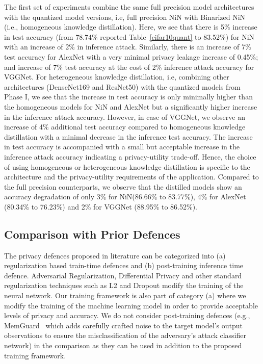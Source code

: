 The first set of experiments combine the same full precision model architectures with the quantized model versions, i.e, full precision NiN with Binarized NiN (i.e., homogeneous knowledge distillation).
Here, we see that there is 5\% increase in test accuracy (from 78.74\% reported Table~\ref{cifar10quant} to 83.52\%) for NiN with an increase of 2\% in inference attack.
Similarly, there is an increase of 7\% test accuracy for AlexNet with a very minimal privacy leakage increase of 0.45\%; and increase of 7\% test accuracy at the cost of 2\% inference attack accuracy for VGGNet.
For heterogeneous knowledge distillation, i.e, combining other architectures (DenseNet169 and ResNet50) with the quantized models from Phase I, we see that the increase in test accuracy is only minimally higher than the homogeneous models for NiN and AlexNet but a significantly higher increase in the inference attack accuracy.
However, in case of VGGNet, we observe an increase of 4\% additional test accuracy compared to homogeneous knowledge distillation with a minimal decrease in the inference test accuracy.
The increase in test accuracy is accompanied with a small but acceptable increase in the inference attack accuracy indicating a privacy-utility trade-off.
Hence, the choice of using homogeneous or heterogeneous knowledge distillation is specific to the architecture and the privacy-utility requirements of the application.
Compared to the full precision counterparts, we observe that the distilled models show an accuracy degradation of only 3\% for NiN(86.66\% to 83.77\%), 4\% for AlexNet (80.34\% to 76.23\%) and 2\% for VGGNet (88.95\% to 86.52\%).

\subsection{Comparison with Prior Defences}
\label{eval-defences}

The privacy defences proposed in literature can be categorized into (a) regularization based train-time defences and (b) post-training inference time defence.
Adversarial Regularization, Differential Privacy and other standard regularization techniques such as L2 and Dropout modify the training of the neural network.
Our training framework is also part of category (a) where we modify the training of the machine learning model in order to provide acceptable levels of privacy and accuracy.
We do not consider post-training defences (e.g., MemGuard~\cite{10.1145/3319535.3363201} which adds carefully crafted noise to the target model's output observations to ensure the misclassification of the adversary's attack classifier network) in the comparison as they can be used in addition to the proposed training framework.

